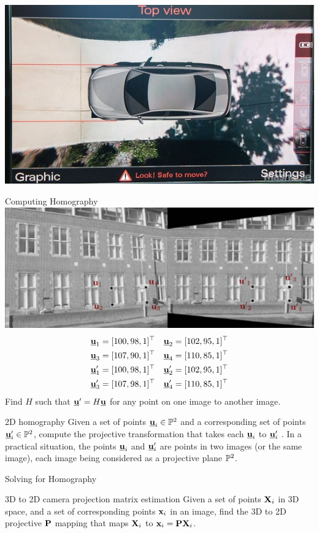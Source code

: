 \documentclass[times,t]{beamer}
\begin{document}
\begin{frame}
  \includegraphics[width=0.60\linewidth]{media/audi top view camera.jpg}
\end{frame}

\begin{frame}{Computing Homography}
  \includegraphics[width=\linewidth]{media/removing-perspective-distortion.png.pdf}
  \begin{align*}
    \underline{\mathbf{u}}_1 &= [100, 98, 1]^\top&
    \underline{\mathbf{u}}_2 &= [102, 95, 1]^\top\\
    \underline{\mathbf{u}}_3 &= [107, 90, 1]^\top&
    \underline{\mathbf{u}}_4 &= [110, 85, 1]^\top \\
    \underline{\mathbf{u}}'_1 &= [100, 98, 1]^\top&
    \underline{\mathbf{u}}'_2 &= [102, 95, 1]^\top\\
    \underline{\mathbf{u}}'_3 &= [107, 98, 1]^\top&
    \underline{\mathbf{u}}'_4 &= [110, 85, 1]^\top
  \end{align*}
  Find $H$ such that $\underline{\mathbf{u}}' = H\underline{\mathbf{u}}$ for any point on one image to another image.
\end{frame}

\begin{frame}{2D homography}
  Given a set of points $\underline{\mathbf{u}}_i \in \mathbb{P}^2$ and a corresponding set of
  points $\underline{\mathbf{u}}'_i \in \mathbb{P}^2$, compute the projective transformation that takes each
  $\underline{\mathbf{u}}_i$ to $\underline{\mathbf{u}}'_i$ . In a practical situation, the points $\underline{\mathbf{u}}_i$ and   $\underline{\mathbf{u}}'_i$  are points in two images
  (or the same image), each image being considered as a projective plane  $\mathbb{P}^2$.
\end{frame}

\begin{frame}{Solving for Homography }
\end{frame}


\begin{frame}{3D  to  2D camera projection matrix estimation}
  Given a set of points $\mathbf{X}_i$ in 3D space, and a set
  of corresponding points $\mathbf{x}_i$ in an image, find the 3D to 2D projective
  $\mathbf{P}$ mapping
  that maps $\mathbf{X}_i$ to $\mathbf{x}_i  =  \mathbf{P}\mathbf{X}_i$.
\end{frame}
\end{document}
